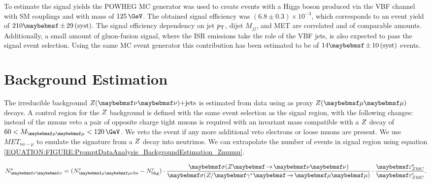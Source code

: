 To estimate the signal yields the \textsc{POWHEG} \gls{MC} generator \cite{ARTICLE:POWHEG_2004,ARTICLE:POWHEG_2007,ARTICLE:POWHEG_2009v1,ARTICLE:POWHEG_2009v2,ARTICLE:POWHEG_2010v1,ARTICLE:POWHEG_2010v2,ARTICLE:POWHEG_2011v1,ARTICLE:POWHEG_2011v2} was used to create events with a Higgs boson produced via the \gls{VBF} channel with \gls{SM} couplings and with mass of $125\,\GeV$. The obtained signal efficiency was $(6.8 \pm 0.3) \times 10^{-3}$, which corresponds to an event yield of $210 \pm 29\syst$. The signal efficiency dependency on jet $p_{\mathrm{T}}$, dijet $M_{jj}$, and \gls{MET} are correlated and of comparable amounts. Additionally, a small amount of gluon-fusion signal, where the \gls{ISR} emissions take the role of the \gls{VBF} jets, is also expected to pass the signal event selection. Using the same \gls{MC} event generator this contribution has been estimated to be of $14 \pm 10\syst$ events.

\section{Background Estimation}
\label{SECTION:PromptDataAnalysis_BackgroundEstimation}


The irreducible background $\Z(\nu \nu)\text{+jets}$ is estimated from data using as proxy $\Z (\mu \mu)$ decays. A control region for the $Z$ background is defined with the same event selection as the signal region, with the following changes: instead of the muons veto a pair of opposite charge tight muons is required with an invariant mass compatible with a $Z$ decay of $60 < M_{\mu\mu}<120\,\GeV$. We veto the event if any more additional veto electrons or loose muons are present. We use $MET_{no-\mu}$ to emulate the signature from a $Z$ decay into neutrinos. We can extrapolate the number of events in signal region using equation \ref{EQUATION:FIGURE:PromptDataAnalysis_BackgroundEstimation_Zmumu}.

\begin{equation}
N^\mathrm{s}_{\nu\nu} = (N^\mathrm{c}_{\mu\mu\text{obs}} - N^\mathrm{c}_\text{bkg}) \cdot \frac{\sigma(\Z \to \nu\nu)}{\sigma(\Z/\gamma^{*} \to \mu\mu)} \cdot \frac{\varepsilon^\mathrm{s}_{\Z \mathrm{MC}}}{\varepsilon^\mathrm{c}_{\Z \mathrm{MC}}}.
\label{EQUATION:FIGURE:PromptDataAnalysis_BackgroundEstimation_Zmumu}
\end{equation}

